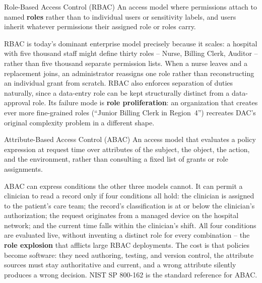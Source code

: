 \begin{definition}{Role-Based Access Control (RBAC)}
An access model where permissions attach to named \textbf{roles} rather than to individual users or
sensitivity labels, and users inherit whatever permissions their assigned role or roles carry.
\end{definition}

RBAC is today's dominant enterprise model precisely because it scales: a hospital with five
thousand staff might define thirty roles -- Nurse, Billing Clerk, Auditor -- rather than five
thousand separate permission lists. When a nurse leaves and a replacement joins, an
administrator reassigns one role rather than reconstructing an individual grant from scratch. RBAC
also enforces separation of duties naturally, since a data-entry role can be kept structurally
distinct from a data-approval role. Its failure mode is \textbf{role proliferation}: an
organization that creates ever more fine-grained roles (``Junior Billing Clerk in Region~4'')
recreates DAC's original complexity problem in a different shape.

\begin{definition}{Attribute-Based Access Control (ABAC)}
An access model that evaluates a policy expression at request time over attributes of the subject,
the object, the action, and the environment, rather than consulting a fixed list of grants or role
assignments.
\end{definition}

ABAC can express conditions the other three models cannot. It can permit a clinician to read a
record only if four conditions all hold: the clinician is assigned to the patient's care team; the
record's classification is at or below the clinician's authorization; the request originates from a
managed device on the hospital network; and the current time falls within the clinician's shift.
All four conditions are evaluated live, without inventing a distinct role for every combination --
the \textbf{role explosion} that afflicts large RBAC deployments. The cost is that policies become software: they need authoring, testing, and
version control, the attribute sources must stay authoritative and current, and a wrong attribute
silently produces a wrong decision. NIST SP 800-162 is the standard reference for ABAC.

